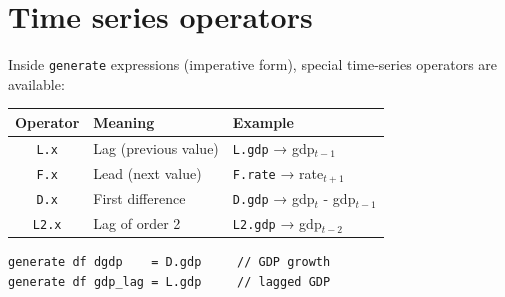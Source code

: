 \section{Time series operators}

Inside \lstinline{generate} expressions (imperative form), special
time-series operators are available:

\begin{center}
\begin{tabular}{cll}
\toprule
\textbf{Operator} & \textbf{Meaning} & \textbf{Example} \\
\midrule
\texttt{L.x}   & Lag (previous value)   & \texttt{L.gdp}  → gdp$_{t-1}$ \\
\texttt{F.x}   & Lead (next value)      & \texttt{F.rate} → rate$_{t+1}$ \\
\texttt{D.x}   & First difference       & \texttt{D.gdp}  → gdp$_t$ - gdp$_{t-1}$ \\
\texttt{L2.x}  & Lag of order 2         & \texttt{L2.gdp} → gdp$_{t-2}$ \\
\bottomrule
\end{tabular}
\end{center}

\begin{lstlisting}[caption={Time series operators}]
generate df dgdp    = D.gdp     // GDP growth
generate df gdp_lag = L.gdp     // lagged GDP
\end{lstlisting}
